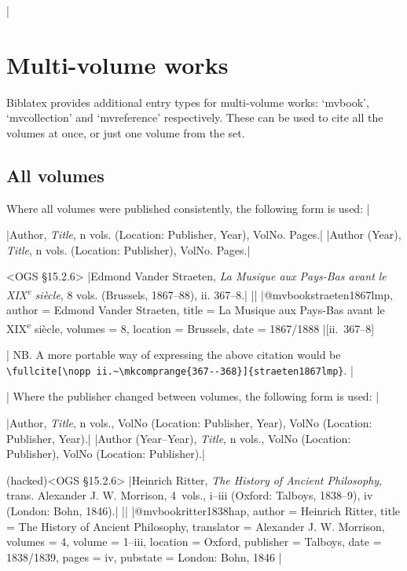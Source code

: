 \documentclass[extrafontsizes,11pt,a4paper,oneside]{memoir}
\newcommand*{\lit}[1]{\textsf{#1}}
\newcommand*{\code}[1]{`\textsf{#1}'}
\begin{document}
\todoc|
\section{Multi-volume works}

Biblatex provides additional entry types for multi-volume works: \code{mvbook}, \code{mvcollection} and \code{mvreference} respectively. These can be used to cite all the volumes at once, or just one volume from the set.

\subsection{All volumes}

Where all volumes were published consistently, the following form is used:
|

\specs
|Author, \emph{Title}, n \lit{vols.} (Location: Publisher, Year), VolNo. Pages.|%
|Author (Year), \emph{Title}, n \lit{vols.} (Location: Publisher), VolNo. Pages.|

\bibexample<OGS \S15.2.6>
|Edmond Vander Straeten, \emph{La Musique aux Pays-Bas avant le XIX\textsuperscript{e} siècle}, 8 vols. (Brussels, 1867--88), ii. 367--8.|
||%
|@mvbook{straeten1867lmp,
    author = {Edmond {Vander Straeten}},
    title = {La Musique aux Pays-Bas avant le XIX\textsuperscript{e} siècle},
    volumes = {8},
    location = {Brussels},
    date = {1867/1888}
}|[ii.~367--8]

\todoc[oxnotes]|
NB. A more portable way of expressing the above citation would be\\
\lstinline!\fullcite[\nopp ii.~\mkcomprange{367--368}]{straeten1867lmp}!.
|

\todoc|
Where the publisher changed between volumes, the following form is used:
|

\specs
|Author, \emph{Title}, n \lit{vols.}, VolNo (Location: Publisher, Year), VolNo (Location: Publisher, Year).|%
|Author (Year–Year), \emph{Title}, n \lit{vols.}, VolNo (Location: Publisher), VolNo (Location: Publisher).|

\bibexample(hacked)<OGS \S15.2.6>
|Heinrich Ritter, \emph{The History of Ancient Philosophy}, trans. Alexander J. W. Morrison, 4~vols., i--iii (Oxford: Talboys, 1838--9), iv (London: Bohn, 1846).|%
||%
|@mvbook{ritter1838hap,
  author = {Heinrich Ritter},
  title = {The History of Ancient Philosophy},
  translator = {Alexander J. W. Morrison},
  volumes = {4},
  volume = {1--iii},
  location = {Oxford},
  publisher = {Talboys},
  date = {1838/1839},
  pages = {iv},
  pubstate = {London: Bohn, 1846}
}|
\end{document}
